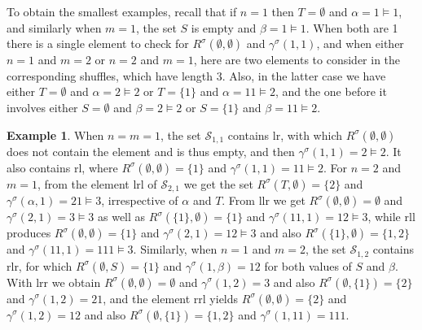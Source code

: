 \documentclass{article}
\theoremstyle{definition}
\newtheorem{ex}[thm]{Example}
\begin{document}
To obtain the smallest examples, recall that if $n=1$ then $T=\emptyset$ and $\alpha=1\vDash1$, and similarly when $m=1$, the set $S$ is empty and $\beta=1\vDash1$. When both are 1 there is a single element to check for $R^{\sigma}(\emptyset,\emptyset)$ and $\gamma^{\sigma}(1,1)$, and when either $n=1$ and $m=2$ or $n=2$ and $m=1$, here are two elements to consider in the corresponding shuffles, which have length 3. Also, in the latter case we have either $T=\emptyset$ and $\alpha=2\vDash2$ or $T=\{1\}$ and $\alpha=11\vDash2$, and the one before it involves either $S=\emptyset$ and $\beta=2\vDash2$ or $S=\{1\}$ and $\beta=11\vDash2$.
\begin{ex}
When $n=m=1$, the set $\mathcal{S}_{1,1}$ contains lr, with which $R^{\sigma}(\emptyset,\emptyset)$ does not contain the element and is thus empty, and then $\gamma^{\sigma}(1,1)=2\vDash2$. It also contains rl, where $R^{\sigma}(\emptyset,\emptyset)=\{1\}$ and $\gamma^{\sigma}(1,1)=11\vDash2$. For $n=2$ and $m=1$, from the element lrl of $\mathcal{S}_{2,1}$ we get the set $R^{\sigma}(T,\emptyset)=\{2\}$ and $\gamma^{\sigma}(\alpha,1)=21\vDash3$, irrespective of $\alpha$ and $T$. From llr we get $R^{\sigma}(\emptyset,\emptyset)=\emptyset$ and $\gamma^{\sigma}(2,1)=3\vDash3$ as well as $R^{\sigma}(\{1\},\emptyset)=\{1\}$ and $\gamma^{\sigma}(11,1)=12\vDash3$, while rll produces $R^{\sigma}(\emptyset,\emptyset)=\{1\}$ and $\gamma^{\sigma}(2,1)=12\vDash3$ and also $R^{\sigma}(\{1\},\emptyset)=\{1,2\}$ and $\gamma^{\sigma}(11,1)=111\vDash3$. Similarly, when $n=1$ and $m=2$, the set $\mathcal{S}_{1,2}$ contains rlr, for which $R^{\sigma}(\emptyset,S)=\{1\}$ and $\gamma^{\sigma}(1,\beta)=12$ for both values of $S$ and $\beta$. With lrr we obtain $R^{\sigma}(\emptyset,\emptyset)=\emptyset$ and $\gamma^{\sigma}(1,2)=3$ and also $R^{\sigma}(\emptyset,\{1\})=\{2\}$ and $\gamma^{\sigma}(1,2)=21$, and the element rrl yields $R^{\sigma}(\emptyset,\emptyset)=\{2\}$ and $\gamma^{\sigma}(1,2)=12$ and also $R^{\sigma}(\emptyset,\{1\})=\{1,2\}$ and $\gamma^{\sigma}(1,11)=111$. \label{exshuff}
\end{ex}
\end{document}
